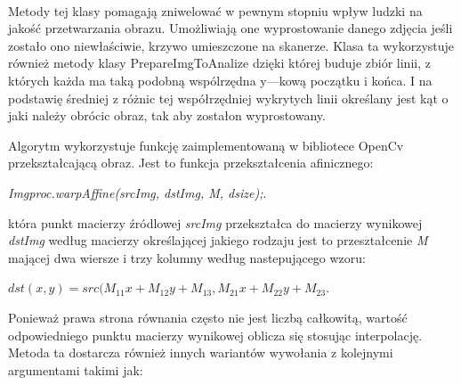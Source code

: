 \documentclass[a4paper,12pt]{article}
\begin{document}
		    \paragraph{} Metody tej klasy pomagają zniwelować w pewnym stopniu wp\l yw      ludzki na jakość przetwarzania obrazu. Umożliwiają one wyprostowanie        danego zdjęcia jeśli zostało ono niew\l aściwie, krzywo umieszczone na      skanerze. Klasa ta wykorzystuje również metody klasy PrepareImgToAnalize     dzięki której buduje zbiór linii, z których każda ma taką podobną           wspólrzędna y---kową początku i końca. I na podstawię średniej z różnic     tej wspó\l rzędniej wykrytych linii określany jest kąt o jaki należy        obrócic obraz, tak aby zosta\l on wyprostowany.  
		
		        Algorytm wykorzystuje funkcję zaimplementowaną w bibliotece OpenCv przekształcającą obraz. Jest to funkcja przekształcenia afinicznego:
    		    \begin{center}
    		        \textit{Imgproc.warpAffine(srcImg, dstImg, M, dsize);}.
    		    \end{center}
		    
		        która punkt macierzy źródlowej \textit{srcImg} przekształca do macierzy wynikowej \textit{dstImg} według macierzy określającej jakiego rodzaju jest to przeształcenie \textit{M} mającej dwa wiersze i trzy kolumny według nastepującego wzoru:
                \begin{center}
                    \textit{$dst(x,y) = src( M_{11} x + M_{12} y + M_{13}, M_{21} x + M_{22} y + M_{23}$}.
                \end{center} \par    
                Ponieważ prawa strona równania często nie jest liczbą całkowitą, wartość odpowiedniego punktu macierzy wynikowej oblicza się stosując interpolację. Metoda ta dostarcza również innych wariantów wywołania z kolejnymi argumentami takimi jak: 
            
\end{document}
